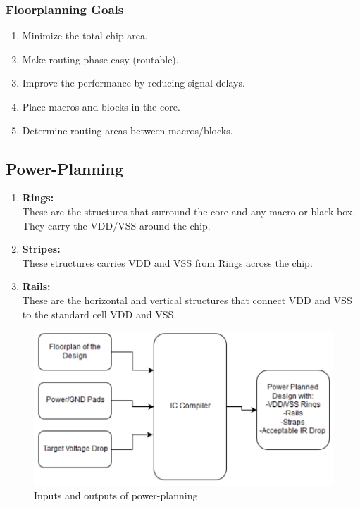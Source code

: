 \documentclass[../main.tex]{subfiles}
\begin{document}
\subsubsection{Floorplanning Goals}
\begin{enumerate}
\item Minimize the total chip area.
\item Make routing phase easy (routable).
\item Improve the performance by reducing signal delays.
\item Place macros and blocks in the core.
\item Determine routing areas between macros/blocks.
\end{enumerate}
\subsection{Power-Planning}

\begin{enumerate}
\item  \textbf{Rings:}\\
These are the structures that surround the core and any macro or black box. They carry the VDD/VSS around the chip.
\item \textbf{Stripes:}\\
These structures carries VDD and VSS from Rings across the chip.
\item \textbf{Rails:}\\
These are the horizontal and vertical structures that connect VDD and VSS to the standard cell VDD and VSS.
\end{enumerate}

\begin{figure}[h]
\centering
\includegraphics[width=15cm]{diagrams/IO_power.PNG}
\caption{ Inputs and outputs of power-planning}
\label{fig:IO_power}
\end{figure}
\end{document}
